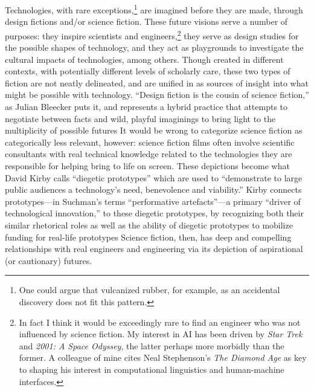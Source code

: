 Technologies, with rare exceptions,\footnote{One could argue that
  vulcanized rubber, for example, as an accidental discovery does not
  fit this pattern.} are imagined before they are made, through design
fictions and/or science fiction. These future
visions serve a number of purposes: they inspire scientists and
engineers,\footnote{In fact I think it would be exceedingly rare to
  find an engineer who was not influenced by science fiction. My
  interest in AI has been driven by \emph{Star Trek} and \emph{2001: A
  Space Odyssey}, the latter perhaps more morbidly than the former. A
  colleague of mine cites Neal Stephenson's
  \emph{The Diamond Age} as key to shaping his interest in
  computational linguistics and human-machine interfaces.} they serve as design
studies for the possible shapes of technology, and they act as
playgrounds to investigate the cultural impacts of technologies, among
others. Though created in different contexts, with potentially
different levels of scholarly care, these two types of fiction are not
neatly delineated, and are unified in as sources of insight into what
might be possible with technology. ``Design fiction is the cousin of
science fiction,'' as Julian Bleecker puts it, and represents a hybrid
practice that attempts to negotiate between facts and wild, playful
imaginings to bring light to the multiplicity of possible
futures\cite[p. 8]{bleecker} It would be wrong to categorize science
fiction as categorically less relevant, however: science fiction
films
often involve scientific consultants with real
technical knowledge related to the technologies they are responsible for
helping bring to life on screen. These depictions become what David
Kirby calls ``diegetic prototypes'' which are used to ``demonstrate to
large public audiences a technology's need, benevolence and
viability.''\cite[p. 43]{kirbyFuture} Kirby connects prototypes---in
Suchman's terms ``performative artefacts''\cite[p. 45]{kirbyFuture}---a primary
``driver of technological innovation,'' to these diegetic prototypes,
by recognizing both their similar rhetorical roles as well as the
ability of diegetic prototypes to mobilize funding for real-life
prototypes\cite[p. 44-47]{kirbyFuture} Science fiction, then, has deep
and compelling relationships with real engineers and engineering via
its depiction of aspirational (or cautionary) futures.


